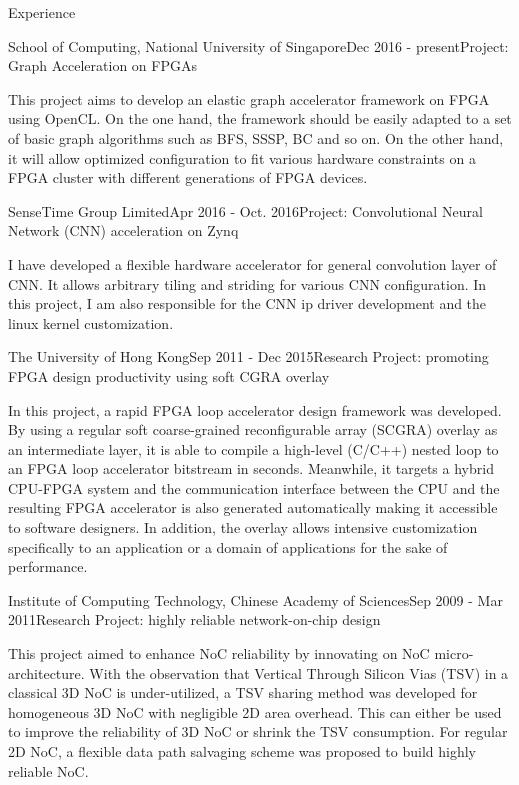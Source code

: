 \documentclass{resume} %
\begin{document}
\begin{rSection}{Experience}
\begin{rSubsection}{School of Computing, National University of Singapore}{Dec
    2016 - present}{Project: Graph Acceleration on FPGAs}{}
\item This project aims to develop an elastic graph accelerator framework on FPGA
    using OpenCL. On the one hand, the framework should be easily
    adapted to a set of basic graph algorithms such as BFS, SSSP, BC and so on. On
    the other hand, it will allow optimized configuration to fit various hardware constraints
    on a FPGA cluster with different generations of FPGA devices.
\end{rSubsection}

\begin{rSubsection}{SenseTime Group Limited}{Apr 2016 - Oct. 2016}{Project: Convolutional Neural Network
    (CNN) acceleration on Zynq}{}
\item I have developed a flexible hardware accelerator for general convolution layer of CNN. It allows
arbitrary tiling and striding for various CNN configuration. In this project, I am also responsible for the CNN
ip driver development and the linux kernel customization.
\end{rSubsection}

\begin{rSubsection}{The University of Hong Kong}{Sep 2011 - Dec 2015}{Research Project: promoting FPGA design productivity using soft CGRA overlay}{}
\item In this project, a rapid FPGA loop accelerator design framework was developed. By using a
    regular soft coarse-grained reconfigurable array (SCGRA) overlay as an intermediate layer, it is
    able to compile a high-level (C/C++) nested loop to an FPGA loop accelerator bitstream in
    seconds. Meanwhile, it targets a hybrid CPU-FPGA system and the communication interface between
    the CPU and the resulting FPGA accelerator is also generated automatically making it accessible
    to software designers. In addition, the overlay allows intensive customization specifically to
    an application or a domain of applications for the sake of performance.
\end{rSubsection}


\begin{rSubsection}{Institute of Computing Technology, Chinese Academy of Sciences}{Sep 2009 - Mar 2011}{Research Project: highly reliable network-on-chip design}{}
\item This project aimed to enhance NoC reliability by innovating on NoC micro-architecture. With
    the observation that Vertical Through Silicon Vias (TSV) in a classical 3D NoC is
    under-utilized, a TSV sharing method was developed for homogeneous 3D NoC with negligible 2D area
    overhead. This can either be used to improve the reliability of 3D NoC or shrink the TSV consumption.
    For regular 2D NoC, a flexible data path salvaging scheme was proposed to build highly reliable NoC.


\end{rSubsection}
\end{rSection}
\end{document}
